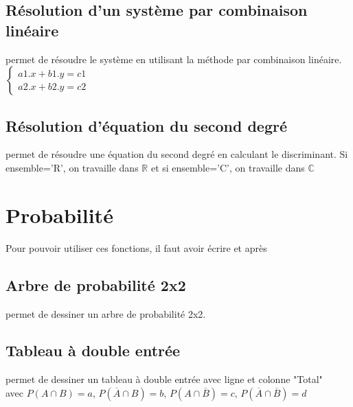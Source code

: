 \section{Résolution d'un système par combinaison linéaire}
 permet de résoudre le système en utilisant la méthode par combinaison linéaire.
$\left \{\begin{matrix}a1.x+b1.y=c1 \\a2.x+b2.y=c2 \end{matrix}\right.$
\section{Résolution d'équation du second degré}
 permet de résoudre une équation du second degré en calculant le discriminant. Si ensemble='R', on travaille dans $\mathbb{R}$ et si ensemble='C', on travaille dans $\mathbb{C}$

\chapter{Probabilité}
Pour pouvoir utiliser ces fonctions, il faut avoir écrire \pyv{} et \pyv{} après \pyv{}


\section{Arbre de probabilité 2x2}
 permet de dessiner un arbre de probabilité 2x2.


\section{Tableau à double entrée}
 permet de dessiner un tableau à double entrée avec ligne et colonne "Total"\\
 avec $P(A \cap  B)=a$, $P(\overline A \cap  B)=b$, $P(A \cap \overline B)=c$, $P(\overline A \cap \overline B)=d$ 

